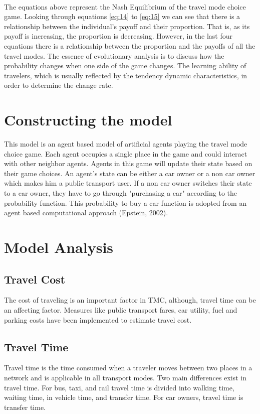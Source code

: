 \paragraph{}The equations above represent the Nash Equilibrium of the travel mode choice game. Looking through equations \ref{eq:14} to \ref{eq:15} we can see that there is a relationship between the individual's payoff and their proportion. That is, as its payoff is increasing, the proportion is decreasing. However, in the last four equations there is a relationship between the proportion and the payoffs of all the travel modes.
The essence of evolutionary analysis is to discuss how the probability changes when one side of the game changes. The learning ability of travelers, which is usually reflected by the tendency dynamic characteristics, in order to determine the change rate.
\section{Constructing the model}
This model is an agent based model of artificial agents playing the travel mode choice game. Each agent occupies a single place in the game and could interact with other neighbor agents. Agents in this game will update their state based on their game choices. An agent's state can be either a car owner or a non car owner which makes him a public transport user. If a non car owner switches their state to a car owner, they have to go through "purchasing a car" according to the probability function. This probability to buy a car function is adopted from an agent based computational approach (Epstein, 2002).
\section{Model Analysis}
\subsection{Travel Cost}
The cost of traveling is an important factor in TMC, although, travel time can be an affecting factor. Measures like public transport fares, car utility, fuel and parking costs have been implemented to estimate travel cost.
\subsection{Travel Time}
Travel time is the time consumed when a traveler moves between two places in a network and is applicable in all transport modes. Two main differences exist in travel time. 
For bus, taxi, and rail travel time is divided into walking time, waiting time, in vehicle time, and transfer time. For car owners, travel time is transfer time. 
